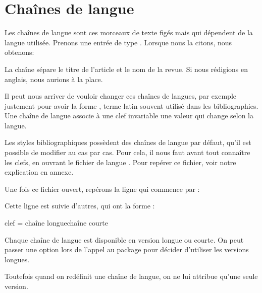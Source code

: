 \bibverbose

\section{Chaînes de langue}\label{i18nchaines}
    
    Les chaînes de langue sont ces morceaux de texte figés mais qui dépendent de la langue utilisée. Prenons une entrée de type . Lorsque nous la citons, nous obtenons:
    
     
     
    \begin{quotation}
        \cite{Junod1992}
    \end{quotation}
    
    La chaîne  sépare le titre de l'article et le nom de la revue. Si nous rédigions en anglais, nous aurions  à la place.  
    
    
    Il peut  nous arriver de vouloir changer ces chaînes de langues, par exemple justement pour avoir la forme , terme latin souvent utilisé dans les bibliographies.  Une chaîne de langue associe à une clef invariable une valeur qui change selon la langue.
    
    Les styles bibliographiques possèdent des chaînes de langue par défaut, qu'il est possible de modifier au cas par cas. Pour cela, il nous faut avant tout connaître les clefs, en ouvrant le fichier de langue . Pour repérer ce fichier, voir notre explication en annexe.
    
    Une fois ce fichier ouvert, repérons la ligne qui commence par :
    

    
    Cette ligne est suivie d'autres, qui ont la forme :
    
    \begin{latexcode}
clef    = {{chaîne longue}{chaîne courte}}
    \end{latexcode}

    
    \begin{plusloins}
    Chaque chaîne de langue est disponible en version longue ou courte. On peut passer une option lors de l'appel au package  pour décider d'utiliser les versions longues.
    
    \begin{latexcode}
\usepackage[abbreviate=false]{biblatex}
    \end{latexcode}

    
     Toutefois quand on redéfinit une chaîne de langue, on ne lui attribue qu'une seule version.
    
    \end{plusloins}
    
